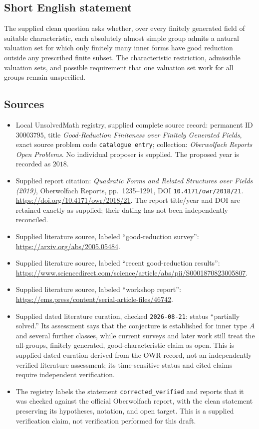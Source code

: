 \documentclass[11pt]{article}
\begin{document}
\subsection{Short English statement}
The supplied clean question asks whether, over every finitely generated field of suitable characteristic, each absolutely almost simple group admits a natural valuation set for which only finitely many inner forms have good reduction outside any prescribed finite subset. The characteristic restriction, admissible valuation sets, and possible requirement that one valuation set work for all groups remain unspecified.
\subsection{Sources}
\begin{itemize}
\item Local UnsolvedMath registry, supplied complete source record: permanent ID \(30003795\), title \emph{Good-Reduction Finiteness over Finitely Generated Fields}, exact source problem code \texttt{catalogue entry}; collection: \emph{Oberwolfach Reports Open Problems}. No individual proposer is supplied. The proposed year is recorded as \(2018\).
\item Supplied report citation: \emph{Quadratic Forms and Related Structures over Fields (2019)}, Oberwolfach Reports, pp.\ 1235--1291, DOI \texttt{10.4171/owr/2018/21}. \url{https://doi.org/10.4171/owr/2018/21}. The report title/year and DOI are retained exactly as supplied; their dating has not been independently reconciled.
\item Supplied literature source, labeled ``good-reduction survey'': \url{https://arxiv.org/abs/2005.05484}.
\item Supplied literature source, labeled ``recent good-reduction results'': \url{https://www.sciencedirect.com/science/article/abs/pii/S0001870823005807}.
\item Supplied literature source, labeled ``workshop report'': \url{https://ems.press/content/serial-article-files/46742}.
\item Supplied dated literature curation, checked \texttt{2026-08-21}: status ``partially solved.'' Its assessment says that the conjecture is established for inner type \(A\) and several further classes, while current surveys and later work still treat the all-groups, finitely generated, good-characteristic claim as open. This is supplied dated curation derived from the OWR record, not an independently verified literature assessment; its time-sensitive status and cited claims require independent verification.
\item The registry labels the statement \texttt{corrected\_verified} and reports that it was checked against the official Oberwolfach report, with the clean statement preserving its hypotheses, notation, and open target. This is a supplied verification claim, not verification performed for this draft.
\end{itemize}
\end{document}
